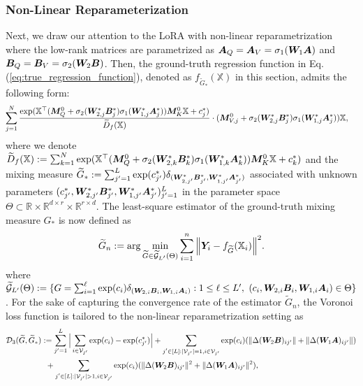 \subsubsection{Non-Linear Reparameterization}
Next, we draw our attention to the LoRA with non-linear reparametrization where the low-rank matrices are parametrized as ${\bm A}_Q= {\bm A}_V = \sigma_{1}(\bm{W}_1{\bm A})$ and ${\bm B}_{Q}= {\bm B}_V = \sigma_{2}(\bm{W}_2{\bm B})$. Then, the ground-truth regression function in Eq.(\ref{eq:true_regression_function}), denoted as $f_{\widetilde{G}_*}(\mathbb{X})$ in this section, admits the following form: 
\begin{align}
 \hspace{-0.25 em}   & \sum_{j=1}^{N} \frac{\exp(\mathbb{X}^{\top} ({\bm M}^0_{Q}+\sigma_2(\bm{W}^*_{2,j}{\bm B}^*_j)\sigma_1(\bm{W}^*_{1,j}{\bm A}^*_j)){\bm M}^0_{K}\mathbb{X}+c^*_j)}{\widetilde{D}_{f}(\mathbb{X})}\cdot({\bm M}^0_{V,j}+\sigma_2(\bm{W}^*_{2,j}{\bm B}^*_j)\sigma_1(\bm{W}^*_{1,j}{\bm A}^*_j))\mathbb{X}, \label{eq:true_regression_function_nonlinear}
\end{align}
where we denote $\widetilde{D}_{f}(\mathbb{X}) := \sum_{k = 1}^{N}\exp(\mathbb{X}^{\top} ({\bm M}^0_{Q}+\sigma_2(\bm{W}^*_{2,k}{\bm B}^*_k)\sigma_1(\bm{W}^*_{1,k}{\bm A}^*_k)){\bm M}^0_{K}\mathbb{X}+c^*_k)$ and the mixing measure $\widetilde{G}_{*} := \sum_{j' = 1}^{L} \exp(c^*_{j'}) \delta_{(\bm{W}^*_{2,j'}{\bm B}_{j'}^*,\bm{W}^*_{1,j'}{\bm A}_{j'}^*)}$ associated with unknown parameters $(c_{j'}^*,\bm{W}^*_{2,j'}{\bm B}_{j'}^*,\bm{W}^*_{1,j'}{\bm A}^*_{j'})_{j'=1}^{L}$ in the parameter space $\Theta\subset\mathbb{R} \times\mathbb{R}^{d\times r}\times\mathbb{R}^{r\times d}$. The least-square estimator of the ground-truth mixing measure $G_*$ is now defined as
\begin{align}
    \label{eq:least_squared_estimator_nonlinear}
    \widetilde{G}_n:=\textnormal{arg} \min_{\widetilde{G}\in \widetilde{\mathcal{G}}_{L'}(\Theta)}\sum_{i=1}^{n}\Big\|{\bm Y}_i-f_{\widetilde{G}}(\mathbb{X}_i)\Big\|^2.
\end{align}
where $\widetilde{\mathcal{G}}_{L'}(\Theta):=\{G=\sum_{i=1}^{\ell}\exp(c_{i})\delta_{(\bm{W}_{2,i}{\bm B}_{i},\bm{W}_{1,i}{\bm A}_{i})}:1\leq \ell\leq L', \  (c_{i},\bm{W}_{2,i}{\bm B}_{i}, \bm{W}_{1,i}{\bm A}_{i}) \in\Theta\}$. For the sake of capturing the convergence rate of the estimator $\widetilde{G}_n$, the Voronoi loss function is tailored to the non-linear reparametrization setting as  
\begin{align*}     
&\mathcal{D}_3(\widetilde{G},\widetilde{G}_*)  :=\sum_{j'=1}^{L}\Big|\sum_{i\in\mathcal{V}_{j'}}\exp(c_{i})-\exp(c^*_{j'})\Big| + \sum_{\substack{j'\in[L]:|\mathcal{V}_{j'}|=1, i\in\mathcal{V}_{j'}}}\exp(c_{i}) (\|\Delta (\Wbm_2\Bbm)_{ij'}\| +\|\Delta (\Wbm_1\Abm)_{ij'}\|)\\ 
& \hspace{5 em} +\sum_{\substack{j'\in[L]:|\mathcal{V}_{j'}|>1, i\in\mathcal{V}_{j'}}}\exp(c_{i}) (\|\Delta (\Wbm_2\Bbm)_{ij'}\|^2 +\|\Delta (\Wbm_1\Abm)_{ij'}\|^2) ,
\end{align*}
